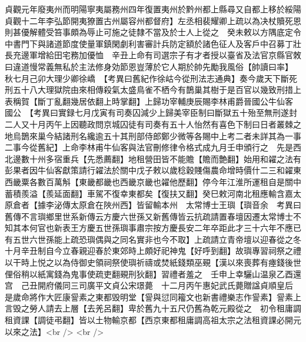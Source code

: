 貞觀元年廢夷州而明陽寧夷屬務州四年復置夷州於黔州都上縣尋又自都上移於綏陽貞觀十二年李弘節開夷獠置古州屬容州都督府】左丞相裴耀卿上疏以為决杖贖死恩則甚優解體受笞事頗為辱止可施之徒隸不當及於士人上從之　癸未敕以方隅底定令中書門下與諸道節度使量軍鎮閑劇利害審計兵防定額於諸色征人及客戶中召募丁壯長充邊軍增給田宅務加優恤　辛丑上命有司選宗子有才者授以臺省及法官京縣官敇曰違道慢常義無私於主法修身効節恩豈薄於它人期於帥先勵我風俗【帥讀曰率】　秋七月己卯大理少卿徐嶠　【考異曰舊紀作徐岵今從刑法志通典】奏今歲天下斷死刑五十八大理獄院由來相傳殺氣太盛鳥雀不栖今有鵲巢其樹于是百官以幾致刑措上表稱賀【斷丁亂翻幾居依翻上時掌翻】上歸功宰輔庚辰賜李林甫爵晉國公牛仙客國公　【考異曰實録七月戊寅有司奏囚減少上歸美宰臣制曰斷獄五十殆至無刑遂封二人又十月丙午上因聽政問京城囚徒有司奏有五十人怡然有喜色下制曰日者叢棘之地烏鵲來巢今結諸刑名纔逾五十其刑部侍郎鄭少微等各賜中上考二者未詳其為一事二事今從舊紀】上命李林甫牛仙客與法官刪修律令格式成九月壬申頒行之　先是西北邊數十州多宿重兵【先悉薦翻】地租營田皆不能贍【贍而艶翻】始用和糴之法有彭果者因牛仙客獻策請行糴法於關中戊子敕以歲稔穀賤傷農命增時價什二三和糴東西畿粟各數百萬斛【東畿都畿也西畿京畿也糴他歷翻】停今年江淮所運租自是關中蓄積羨溢【羨延面翻】車駕不復幸東都矣【復扶又翻】癸巳敕河南北租應輸含嘉太原倉者【據李泌傳太原倉在陜州西】皆留輸本州　太常博士王璵【璵音余　考異曰舊傳不言璵鄉里世系新傳云方慶六世孫又新舊傳皆云抗疏請置春壇因遷太常博士不知其本何官也新表王方慶五世孫璵事肅宗按方慶長安二年卒距此才三十六年不應已有五世六世孫能上疏恐璵偶與之同名實非也今不取】上疏請立青帝壇以迎春從之冬十月辛丑制自今立春親迎春於東郊時上頗好祀神鬼【好呼到翻】故璵專習祠祭之禮以干時上悦之以為侍御史領祠祭使璵祈禱或焚紙錢類巫覡【漢以來喪葬有瘞錢後世俚俗稍以紙寓錢為鬼事使疏吏翻覡刑狄翻】習禮者羞之　壬申上幸驪山温泉乙酉還宫　己丑開府儀同三司廣平文貞公宋璟薨　十二月丙午惠妃武氏薨贈諡貞順皇后　是歲命將作大匠康諐素之東都毁明堂【諐與愆同籕文也新書禮樂志作諐素】諐素上言毁之勞人請去上層【去羌呂翻】卑於舊九十五尺仍舊為乾元殿從之　初令租庸調租資課【調徒弔翻】皆以土物輸京都【西京東都租庸調高祖太宗之法租資課必開元以來之法】<br />
<br />
